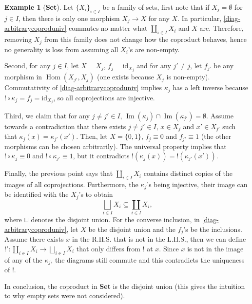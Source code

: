 \documentclass{article}
\theoremstyle{definition}
\newtheorem{exmp}[thm]{Example}
\theoremstyle{remark}
\DeclareMathOperator{\im}{Im}
\DeclareMathOperator{\Hom}{Hom}
\newcommand{\id}{\text{id}}
\begin{document}
\begin{exmp}[\textbf{Set}]
    Let $\{X_i\}_{i \in I}$ be a family of sets, first note that if $X_j = \emptyset$ for $j \in I$, then there is only one morphism $X_j \rightarrow X$ for any $X$. In particular, \eqref{diag-arbitrarycoproduniv} commutes no matter what $\coprod_{i \in I} X_i$ and $X$ are. Therefore, removing $X_j$ from this family does not change how the coproduct behaves, hence no generality is loss from assuming all $X_i$'s are non-empty.

    Second, for any $j \in I$, let $X = X_j$, $f_j = \id_{X_j}$ and for any $j' \neq j$, let $f_{j'}$ be any morphism in $\Hom(X_{j'}, X_j)$ (one exists because $X_j$ is non-empty). Commutativity of \eqref{diag-arbitrarycoproduniv} implies $\kappa_j$ has a left inverse because $! \circ \kappa_j = f_j = \id_{X_j}$, so all coprojections are injective.

    Third, we claim that for any $j \neq j' \in I$, $\im(\kappa_j) \cap \im(\kappa_{j'}) = \emptyset$. Assume towards a contradiction that there exists $j\neq j' \in I$, $x \in X_j$ and $x' \in X_{j'}$ such that $\kappa_j(x) = \kappa_{j'}(x')$. Then, let $X = \{0,1\}$, $f_j \equiv 0$ and $f_{j'} \equiv 1$ (the other morphisms can be chosen arbitrarily). The universal property implies that $! \circ \kappa_j \equiv 0$ and $!\circ \kappa_{j'} \equiv 1$, but it contradicts $!(\kappa_j(x)) = !(\kappa_{j'}(x'))$.

    Finally, the previous point says that $\coprod_{i\in I} X_i$ contains distinct copies of the images of all coprojections. Furthermore, the $\kappa_j$'s being injective, their image can be identified with the $X_j$'s to obtain \[\bigsqcup_{i \in I} X_i \subseteq \coprod_{i \in I} X_i,\]
    where $\sqcup$ denotes the disjoint union. For the converse inclusion, in \eqref{diag-arbitrarycoproduniv}, let $X$ be the disjoint union and the $f_j$'s be the inclusions. Assume there exists $x$ in the R.H.S. that is not in the L.H.S., then we can define $!': \coprod_{i \in I} X_i\rightarrow \bigsqcup_{i \in I} X_i$ that only differs from $!$ at $x$. Since $x$ is not in the image of any of the $\kappa_j$, the diagrams still commute and this contradicts the uniqueness of $!$.

    In conclusion, the coproduct in \textbf{Set} is the disjoint union (this gives the intuition to why empty sets were not considered).
\end{exmp}
\end{document}
